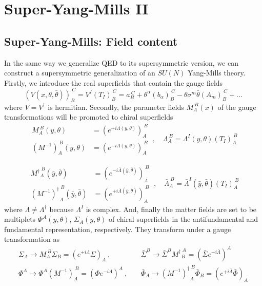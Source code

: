 \documentclass[a4paper,12pt]{article}
\numberwithin{equation}{section}
\numberwithin{exe}{section}
\newcommand{\yb}{{\bar y}}
\renewcommand{\a}{{\alpha}}
\renewcommand{\L}{{\Lambda}}
\newcommand{\Lb}{{\bar\Lambda}}
\newcommand{\s}{{\sigma}}
\renewcommand{\S}{{\Sigma}}
\newcommand{\Sb}{{\bar\Sigma}}
\renewcommand{\t}{{\theta}}
\newcommand{\tb}{{\bar\theta}}
\newcommand{\Phib}{{\bar \Phi}}
\begin{document}
\newpage

\section{Super-Yang-Mills II}

\subsection{Super-Yang-Mills: Field content}
In the same way we generalize QED to its supersymmetric version, we can construct a supersymmetric generalization of an $SU(N)$ Yang-Mills theory. Firstly, we introduce the real superfields that contain the gauge fields
	\begin{equation}
	(V(x,\t,\tb))_B^{\ C} = V^I (T_I)_B^{\ C} = a_B^{\ C} + \t^\a(b_\a)_B^{\ C} - \t\s^m\tb (A_m)_B^{\ C} + \ldots
	\end{equation}
where $V = V^\dagger $ is hermitian. Secondly, the parameter fields $M_A^{\ B}(x)$ of the gauge transformations will be promoted to chiral superfields
	\begin{equation}
		\begin{aligned}
		M_A^{\ B}(y,\t) & = (e^{+i\L(y,\t)})_A^{\ B} \\
		(M^{-1})_A^{\ B}(y,\t) & = (e^{-i\L(y,\t)})_A^{\ B}
		\end{aligned}
	\ ,\quad \L_A^{\ B} = \L^I(y,\t) (T_I)_A^{\ B}
	\end{equation}

	\begin{equation}
		\begin{aligned}
		{M^\dagger}_A^{\ B}(\yb,\tb) & = (e^{-i\Lb(\yb,\tb)})_A^{\ B} \\
		{(M^{-1})^\dagger}_A^{\ B}(\yb,\tb) & = (e^{+i\Lb(\yb,\tb)})_A^{\ B}
		\end{aligned}
	\ ,\quad \Lb_A^{\ B} = \Lb^I(\yb,\tb) (T_I)_A^{\ B}
	\end{equation}
where $\L\neq \L^\dagger$ because $\L^I$ is complex. And, finally the matter fields are set to be multiplets $\Phi^A(y,\t)$, $\S_A(y,\t)$ of chiral superfields in the antifundamental and fundamental representation, respectively. They transform under a gauge transformation as
	\begin{equation}
		\begin{aligned}
		\S_A\rightarrow M_A^{\ B}\S_B=(e^{+i\L}\S)_A\ ,&\quad \Sb^B\rightarrow \Sb^B {M^\dagger}_B^{\ A} = (\Sb e^{-i\Lb})^A \\
		\Phi^A\rightarrow \Phi^A {(M^{-1})}_A^{\ B} = (\Phi e^{-i\L})^A \ ,&\quad \Phib_A\rightarrow {(M^{-1})^\dagger}_A^{\ B}\Phib_B = (e^{+i\Lb}\Phib)_A
		\end{aligned}
	\end{equation}
\end{document}
